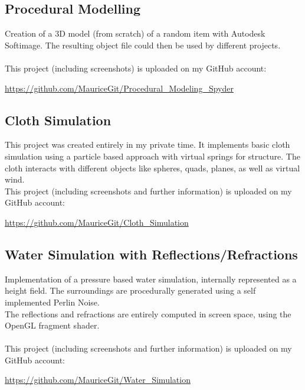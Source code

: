 \documentclass[a4paper, 12pt]{article}
\begin{document}
\subsection{Procedural Modelling}

Creation of a 3D model (from scratch) of a random item with Autodesk Softimage.
The resulting object file could then be used by different projects.
\\
\\
This project (including screenshots) is uploaded on my GitHub account:

\begin{center}
	\url{https://github.com/MauriceGit/Procedural_Modeling_Spyder}
\end{center}

\subsection{Cloth Simulation}

This project was created entirely in my private time. It implements basic cloth simulation using a particle 
based approach with virtual springs for structure. The cloth interacts with different objects like spheres,
quads, planes, as well as virtual wind. 
\\
This project (including screenshots and further information) is uploaded on my GitHub account:

\begin{center}
	\url{https://github.com/MauriceGit/Cloth_Simulation}
\end{center}

\subsection{Water Simulation with  Reflections/Refractions}\label{subsec:water}

Implementation of a pressure based water simulation, internally represented as a height field.
The surroundings are procedurally generated using a self implemented Perlin Noise.
\\
The reflections and refractions are entirely computed in screen space, using the OpenGL fragment
shader.
\\
\\
This project (including screenshots and further information) is uploaded on my GitHub account:

\begin{center}
	\url{https://github.com/MauriceGit/Water_Simulation}
\end{center}
\end{document}
